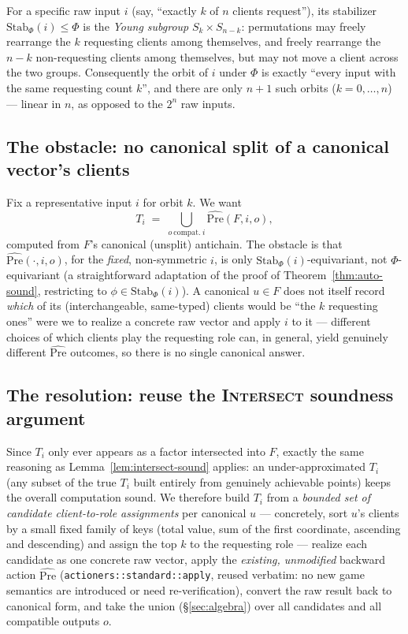 \documentclass[11pt]{article}
\newcommand{\Phigroup}{\Phi}
\newcommand{\Stab}{\mathrm{Stab}}
\newcommand{\PreHat}{\widehat{\mathrm{Pre}}}
\begin{document}
For a specific raw input $i$ (say, ``exactly $k$ of $n$ clients request''),
its stabilizer $\Stab_\Phigroup(i) \leq \Phigroup$ is the \emph{Young
subgroup} $S_k \times S_{n-k}$: permutations may freely rearrange the $k$
requesting clients among themselves, and freely rearrange the $n-k$
non-requesting clients among themselves, but may not move a client across
the two groups. Consequently the orbit of $i$ under $\Phigroup$ is exactly
``every input with the same requesting count $k$'', and there are only
$n+1$ such orbits ($k=0,\dots,n$) --- linear in $n$, as opposed to the
$2^n$ raw inputs.

\subsection{The obstacle: no canonical split of a canonical vector's clients}

Fix a representative input $i$ for orbit $k$. We want
\[
  T_i \;=\; \bigcup_{o\ \mathrm{compat.}\ i} \PreHat(F, i, o),
\]
computed from $F$'s canonical (unsplit) antichain. The obstacle is that
$\PreHat(\cdot,i,o)$, for the \emph{fixed}, non-symmetric $i$, is only
$\Stab_\Phigroup(i)$-equivariant, not $\Phigroup$-equivariant (a
straightforward adaptation of the proof of Theorem~\ref{thm:auto-sound},
restricting to $\phi \in \Stab_\Phigroup(i)$). A canonical $u \in F$ does
not itself record \emph{which} of its (interchangeable, same-typed)
clients would be ``the $k$ requesting ones'' were we to realize a concrete
raw vector and apply $i$ to it --- different choices of which clients play
the requesting role can, in general, yield genuinely different $\PreHat$
outcomes, so there is no single canonical answer.

\subsection{The resolution: reuse the \textsc{Intersect} soundness argument}

Since $T_i$ only ever appears as a factor intersected into $F$, exactly
the same reasoning as Lemma~\ref{lem:intersect-sound} applies: an
under-approximated $T_i$ (any subset of the true $T_i$ built entirely from
genuinely achievable points) keeps the overall computation sound. We
therefore build $T_i$ from a \emph{bounded set of candidate
client-to-role assignments} per canonical $u$ --- concretely, sort $u$'s
clients by a small fixed family of keys (total value, sum of the first
coordinate, ascending and descending) and assign the top $k$ to the
requesting role --- realize each candidate as one concrete raw vector,
apply the \emph{existing, unmodified} backward action $\PreHat$
(\texttt{actioners::standard::apply}, reused verbatim: no new game
semantics are introduced or need re-verification), convert the raw result
back to canonical form, and take the union (\S\ref{sec:algebra}) over all
candidates and all compatible outputs $o$.
\end{document}
